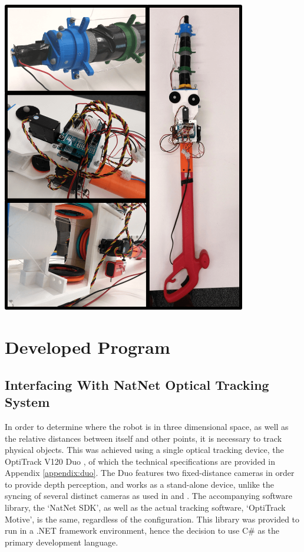 \documentclass[11pt]{article}
\begin{document}
\begin{center}
\includegraphics[width=0.8\textwidth]{images/fullDevice.png}
\label{figure:fullDevice}
\end{center}

\pagebreak
\section{Developed Program}

\subsection{Interfacing With NatNet Optical Tracking System}
\label{section:natnet}
In order to determine where the robot is in three dimensional space, as well as the relative distances between itself and other points, it is necessary to track physical objects. This was achieved using a single optical tracking device, the OptiTrack V120 Duo \cite{OptiTrackSite}, of which the technical specifications are provided in Appendix \ref{appendix:duo}. The Duo features two fixed-distance cameras in order to provide depth perception, and works as a stand-alone device, unlike the syncing of several distinct cameras as used in \cite{GreggSmithDesign} and \cite{GreggSmithFeedback}. The accompanying software library, the `NatNet SDK', as well as the actual tracking software, `OptiTrack Motive', is the same, regardless of the configuration. This library was provided to run in a .NET framework environment, hence the decision to use C\# as the primary development language.
\end{document}
